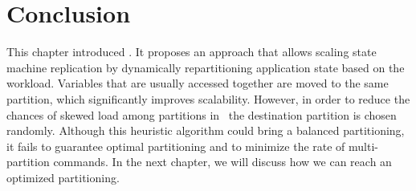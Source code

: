 \section{Conclusion}
\label{sec:dssmr-conclusion}
This chapter introduced \dssmr. It
proposes an approach that allows scaling state machine replication by
dynamically repartitioning application state based on the workload.  Variables
that are usually accessed together are moved to the same partition, which
significantly improves scalability. However, in order to reduce the chances of
skewed load among partitions in \dssmr\, the destination partition is chosen
randomly. Although this heuristic algorithm could bring a balanced partitioning,
it fails to guarantee optimal partitioning and to minimize the rate of
multi-partition commands. In the next chapter, we will discuss how
we can reach an optimized partitioning.
